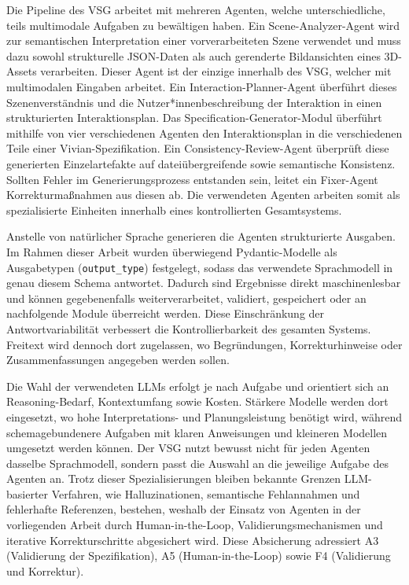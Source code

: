 Die Pipeline des VSG arbeitet mit mehreren Agenten, welche unterschiedliche, teils multimodale Aufgaben zu bewältigen haben. Ein Scene-Analyzer-Agent wird zur semantischen Interpretation einer vorverarbeiteten Szene verwendet und muss dazu sowohl strukturelle JSON-Daten als auch gerenderte Bildansichten eines 3D-Assets verarbeiten. Dieser Agent ist der einzige innerhalb des VSG, welcher mit multimodalen Eingaben arbeitet. Ein Interaction-Planner-Agent überführt dieses Szenenverständnis und die Nutzer*innenbeschreibung der Interaktion in einen strukturierten Interaktionsplan. Das Specification-Generator-Modul überführt mithilfe von vier verschiedenen Agenten den Interaktionsplan in die verschiedenen Teile einer Vivian-Spezifikation. Ein Consistency-Review-Agent überprüft diese generierten Einzelartefakte auf dateiübergreifende sowie semantische Konsistenz. Sollten Fehler im Generierungsprozess entstanden sein, leitet ein Fixer-Agent Korrekturmaßnahmen aus diesen ab. Die verwendeten Agenten arbeiten somit als spezialisierte Einheiten innerhalb eines kontrollierten Gesamtsystems.

Anstelle von natürlicher Sprache generieren die Agenten strukturierte Ausgaben. Im Rahmen dieser Arbeit wurden überwiegend Pydantic-Modelle als Ausgabetypen (\texttt{output\_type}) festgelegt, sodass das verwendete Sprachmodell in genau diesem Schema antwortet. Dadurch sind Ergebnisse direkt maschinenlesbar und können gegebenenfalls weiterverarbeitet, validiert, gespeichert oder an nachfolgende Module überreicht werden. Diese Einschränkung der Antwortvariabilität verbessert die Kontrollierbarkeit des gesamten Systems. Freitext wird dennoch dort zugelassen, wo Begründungen, Korrekturhinweise oder Zusammenfassungen angegeben werden sollen.

Die Wahl der verwendeten LLMs erfolgt je nach Aufgabe und orientiert sich an Reasoning-Bedarf, Kontextumfang sowie Kosten. Stärkere Modelle werden dort eingesetzt, wo hohe Interpretations- und Planungsleistung benötigt wird, während schemagebundenere Aufgaben mit klaren Anweisungen und kleineren Modellen umgesetzt werden können. Der VSG nutzt bewusst nicht für jeden Agenten dasselbe Sprachmodell, sondern passt die Auswahl an die jeweilige Aufgabe des Agenten an. Trotz dieser Spezialisierungen bleiben bekannte Grenzen LLM-basierter Verfahren, wie Halluzinationen, semantische Fehlannahmen und fehlerhafte Referenzen, bestehen, weshalb der Einsatz von Agenten in der vorliegenden Arbeit durch Human-in-the-Loop, Validierungsmechanismen und iterative Korrekturschritte abgesichert wird. Diese Absicherung adressiert A3 (Validierung der Spezifikation), A5 (Human-in-the-Loop) sowie F4 (Validierung und Korrektur).

